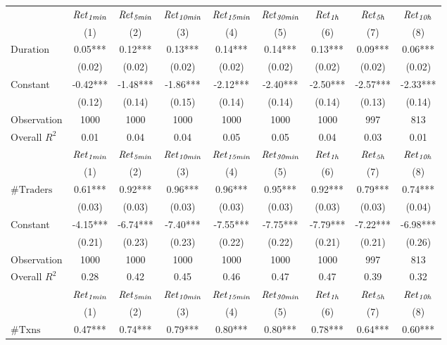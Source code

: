 \begin{tabular}{lcccccccc}
\hline
 & ${\it Ret}_{\it 1min}$ & ${\it Ret}_{\it 5min}$ & ${\it Ret}_{\it 10min}$ & ${\it Ret}_{\it 15min}$ & ${\it Ret}_{\it 30min}$ & ${\it Ret}_{\it 1h}$ & ${\it Ret}_{\it 5h}$ & ${\it Ret}_{\it 10h}$ \\
 & (1) & (2) & (3) & (4) & (5) & (6) & (7) & (8) \\
\hline
$\text{Duration}$ & 0.05*** & 0.12*** & 0.13*** & 0.14*** & 0.14*** & 0.13*** & 0.09*** & 0.06*** \\
 & (0.02) & (0.02) & (0.02) & (0.02) & (0.02) & (0.02) & (0.02) & (0.02) \\
Constant & -0.42*** & -1.48*** & -1.86*** & -2.12*** & -2.40*** & -2.50*** & -2.57*** & -2.33*** \\
 & (0.12) & (0.14) & (0.15) & (0.14) & (0.14) & (0.14) & (0.13) & (0.14) \\
Observation & 1000 & 1000 & 1000 & 1000 & 1000 & 1000 & 997 & 813 \\
Overall $R^2$ & 0.01 & 0.04 & 0.04 & 0.05 & 0.05 & 0.04 & 0.03 & 0.01 \\
\hline
 & ${\it Ret}_{\it 1min}$ & ${\it Ret}_{\it 5min}$ & ${\it Ret}_{\it 10min}$ & ${\it Ret}_{\it 15min}$ & ${\it Ret}_{\it 30min}$ & ${\it Ret}_{\it 1h}$ & ${\it Ret}_{\it 5h}$ & ${\it Ret}_{\it 10h}$ \\
 & (1) & (2) & (3) & (4) & (5) & (6) & (7) & (8) \\
\hline
$\#\text{Traders}$ & 0.61*** & 0.92*** & 0.96*** & 0.96*** & 0.95*** & 0.92*** & 0.79*** & 0.74*** \\
 & (0.03) & (0.03) & (0.03) & (0.03) & (0.03) & (0.03) & (0.03) & (0.04) \\
Constant & -4.15*** & -6.74*** & -7.40*** & -7.55*** & -7.75*** & -7.79*** & -7.22*** & -6.98*** \\
 & (0.21) & (0.23) & (0.23) & (0.22) & (0.22) & (0.21) & (0.21) & (0.26) \\
Observation & 1000 & 1000 & 1000 & 1000 & 1000 & 1000 & 997 & 813 \\
Overall $R^2$ & 0.28 & 0.42 & 0.45 & 0.46 & 0.47 & 0.47 & 0.39 & 0.32 \\
\hline
 & ${\it Ret}_{\it 1min}$ & ${\it Ret}_{\it 5min}$ & ${\it Ret}_{\it 10min}$ & ${\it Ret}_{\it 15min}$ & ${\it Ret}_{\it 30min}$ & ${\it Ret}_{\it 1h}$ & ${\it Ret}_{\it 5h}$ & ${\it Ret}_{\it 10h}$ \\
 & (1) & (2) & (3) & (4) & (5) & (6) & (7) & (8) \\
\hline
$\#\text{Txns}$ & 0.47*** & 0.74*** & 0.79*** & 0.80*** & 0.80*** & 0.78*** & 0.64*** & 0.60*** \\

\end{tabular}
